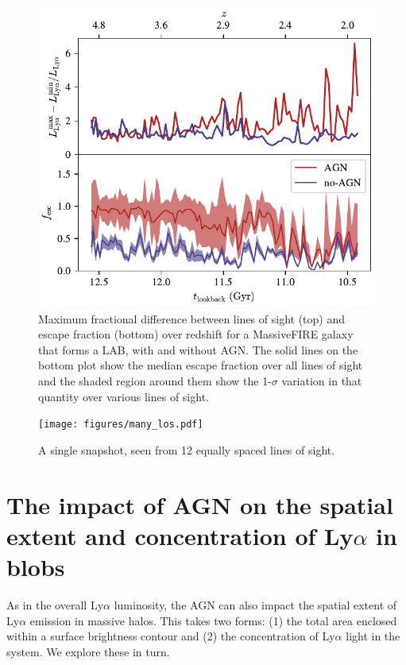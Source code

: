 \begin{figure}
    \centering
    \includegraphics[width=\textwidth,height=\textheight,keepaspectratio]{figures/agn_stats_by_los.pdf}
    \caption{Maximum fractional difference between lines of sight (top) and escape fraction (bottom) over redshift for a MassiveFIRE galaxy that forms a LAB, with and without AGN. The solid lines on the bottom plot show the median escape fraction over all lines of sight and the shaded region around them show the 1-$\sigma$ variation in that quantity over various lines of sight.}
    \label{fig:f_esc}
\end{figure}

\begin{figure}
    \centering
    \texttt{[image: figures/many\_los.pdf]}
    \caption{
        A single snapshot, seen from 12 equally spaced lines of sight.
    }
    \label{fig:many_los}
\end{figure}


\section{The impact of AGN on the spatial extent and concentration of Ly\texorpdfstring{$\alpha$}{a} in blobs}

As in the overall Ly$\alpha$ luminosity, the AGN can also impact the spatial extent of Ly$\alpha$ emission in massive halos. This takes two forms: (1) the total area enclosed within a surface brightness contour and (2) the concentration of Ly$\alpha$ light in the system.  We explore these in turn.

